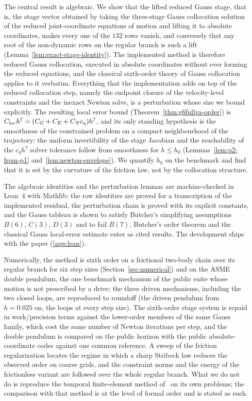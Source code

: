 \documentclass[preprint,12pt]{elsarticle}
\begin{document}
The central result is algebraic. We show that the lifted reduced Gauss stage, that is, the stage
vector obtained by taking the three-stage Gauss collocation solution of the reduced joint-coordinate
equations of motion and lifting it to absolute coordinates, makes every one of the $132$ rows
vanish, and conversely that any root of the non-dynamic rows on the regular branch is such a lift
(Lemma~\ref{lem:exact-stage-identity}). The implemented method is therefore reduced Gauss
collocation, executed in absolute coordinates without ever forming the reduced equations, and the
classical sixth-order theory of Gauss collocation applies to it verbatim. Everything that the
implementation adds on top of the reduced collocation step, namely the endpoint closure of the
velocity-level constraints and the inexact Newton solve, is a perturbation whose size we bound
explicitly. The resulting local error bound (Theorem~\ref{thm:g6fullva-order}) is
$C_{\rm loc}h^7 = (C_G + C_E + C_N c_\eta)h^7$, and its only standing hypothesis is the smoothness
of the constrained problem on a compact neighbourhood of the trajectory: the uniform invertibility
of the stage Jacobian and the reachability of the $c_\eta h^7$ solver tolerance follow from
smoothness for $h\le h_0$ (Lemmas~\ref{lem:p2-from-p1} and~\ref{lem:newton-envelope}). We quantify
$h_0$ on the benchmark and find that it is set by the curvature of the friction law, not by the
collocation structure.

The algebraic identities and the perturbation lemmas are machine-checked in Lean~4 with Mathlib:
the row identities are proved for a transcription of the implemented residual, the perturbation
chain is proved with its explicit constants, and the Gauss tableau is shown to satisfy Butcher's
simplifying assumptions $B(6)$, $C(3)$, $D(3)$ and to fail $B(7)$. Butcher's order theorem and the
classical Gauss local-error estimate enter as cited results. The development ships with the paper
(\ref{app:lean}).

Numerically, the method is sixth order on a frictional two-body chain over its regular branch for
six step sizes (Section~\ref{sec:numerical}) and on the ASME double pendulum, the one benchmark
mechanism of the public suite whose motion is not prescribed by a drive; the three driven
mechanisms, including the two closed loops, are reproduced to roundoff (the driven pendulum from
$h=0.025$ on, the loops at every step size). The
sixth-order stage system is repaid in work/precision terms against the lower-order members of the
same Gauss family, which cost the same number of Newton iterations per step, and the double pendulum
is compared on the public horizon with the public absolute-coordinate codes against one common
reference. A sweep of the friction regularization locates the regime in which a sharp Stribeck law
reduces the observed order on coarse grids, and the constraint norms and the energy of the
frictionless variant are followed over the whole regular branch. What we do not do is reproduce the
temporal finite-element method of~\cite{chaturvedi2026tfe} on its own problems; the comparison with
that method is at the level of formal order and is stated as such.
\end{document}
